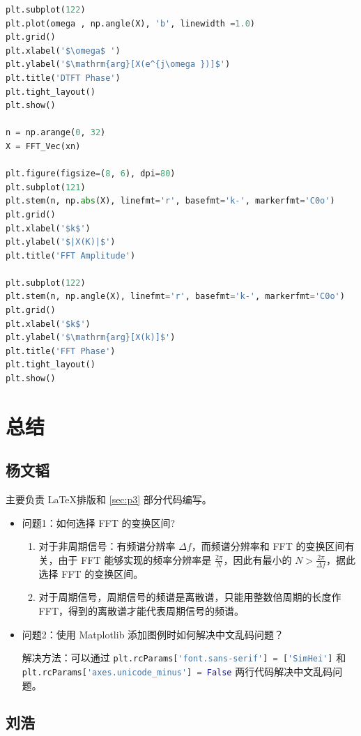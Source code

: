 \documentclass[12pt,AutoFakeBold]{article}
\begin{document}
\begin{lstlisting}[language=Python]
plt.subplot(122)
plt.plot(omega , np.angle(X), 'b', linewidth =1.0)
plt.grid()
plt.xlabel('$\omega$ ')
plt.ylabel('$\mathrm{arg}[X(e^{j\omega })]$')
plt.title('DTFT Phase')
plt.tight_layout()
plt.show()

n = np.arange(0, 32)
X = FFT_Vec(xn)

plt.figure(figsize=(8, 6), dpi=80)
plt.subplot(121)
plt.stem(n, np.abs(X), linefmt='r', basefmt='k-', markerfmt='C0o')
plt.grid()
plt.xlabel('$k$')
plt.ylabel('$|X(K)|$')
plt.title('FFT Amplitude')

plt.subplot(122)
plt.stem(n, np.angle(X), linefmt='r', basefmt='k-', markerfmt='C0o')
plt.grid()
plt.xlabel('$k$')
plt.ylabel('$\mathrm{arg}[X(k)]$')
plt.title('FFT Phase')
plt.tight_layout()
plt.show()
\end{lstlisting}

\section{总结}

\subsection{杨文韬}

主要负责 \LaTeX 排版和 \ref{sec:p3} 部分代码编写。

\begin{itemize}
\item 问题1：如何选择 FFT 的变换区间?

\begin{enumerate}[1.]
\item 对于非周期信号：有频谱分辨率 $\Delta f$，而频谱分辨率和 FFT 的变换区间有关，由于 FFT 能够实现的频率分辨率是 $\frac{2\pi}{N}$，因此有最小的 $N>\frac{2\pi}{\Delta f}$，据此选择 FFT 的变换区间。
\item 对于周期信号，周期信号的频谱是离散谱，只能用整数倍周期的长度作 FFT，得到的离散谱才能代表周期信号的频谱。
\end{enumerate}

\item 问题2：使用 Matplotlib 添加图例时如何解决中文乱码问题？

解决方法：可以通过 \lstinline[language=Python]|plt.rcParams['font.sans-serif'] = ['SimHei']| 和 \lstinline[language=Python]|plt.rcParams['axes.unicode_minus'] = False| 两行代码解决中文乱码问题。
\end{itemize}

\subsection{刘浩}
\end{document}
